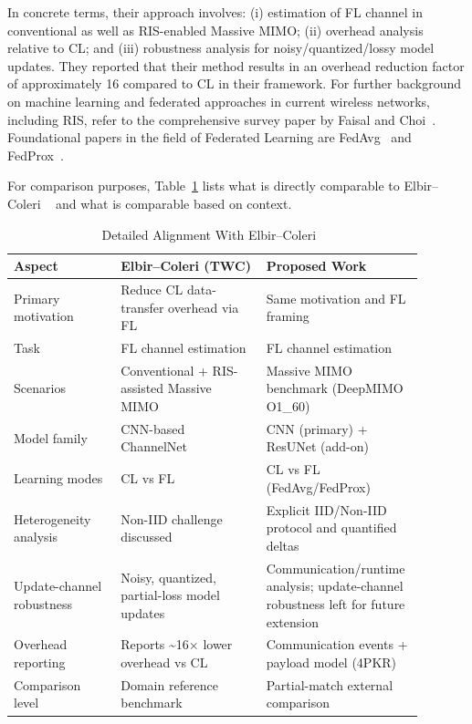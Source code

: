 \documentclass[runningheads]{llncs}
\begin{document}
In concrete terms, their approach involves: (i) estimation of FL channel in conventional as well as RIS-enabled Massive MIMO; (ii) overhead analysis relative to CL; and (iii) robustness analysis for noisy/quantized/lossy model updates.
They reported that their method results in an overhead reduction factor of approximately 16 compared to CL in their framework. For further background on machine learning and federated approaches in current wireless networks, including RIS, refer to the comprehensive survey paper by Faisal and Choi~\cite{faisal2022rismlsurvey}. Foundational papers in the field of Federated Learning are FedAvg~\cite{mcmahan2017fedavg} and FedProx~\cite{li2020fedprox}.


For comparison purposes,  Table~\ref{tab:alignment_ec} lists what is directly comparable to
Elbir–Coleri ~\cite{elbir2021flchannel} and what is comparable based on context.

\begin{table}[htbp]
\caption{Detailed Alignment With Elbir--Coleri~\cite{elbir2021flchannel}}
\label{tab:alignment_ec}
\centering
\begin{tabular}{p{0.25\linewidth}p{0.34\linewidth}p{0.30\linewidth}}
\toprule
Aspect & Elbir--Coleri (TWC) & Proposed Work \\
\midrule
Primary motivation & Reduce CL data-transfer overhead via FL & Same motivation and FL framing \\
Task & FL channel estimation & FL channel estimation \\
Scenarios & Conventional + RIS-assisted Massive MIMO & Massive MIMO benchmark (DeepMIMO O1\_60) \\
Model family & CNN-based ChannelNet & CNN (primary) + ResUNet (add-on) \\
Learning modes & CL vs FL & CL vs FL (FedAvg/FedProx) \\
Heterogeneity \newline analysis & Non-IID challenge discussed & Explicit IID/Non-IID protocol and quantified deltas \\
Update-channel \newline robustness & Noisy, quantized, partial-loss model updates & Communication/runtime analysis; update-channel robustness left for future extension \\
Overhead reporting & Reports \textasciitilde16$\times$ lower overhead vs CL & Communication events + payload model (4PKR) \\
Comparison level & Domain reference benchmark & Partial-match external comparison \\
\bottomrule
\end{tabular}
\end{table}
\end{document}
